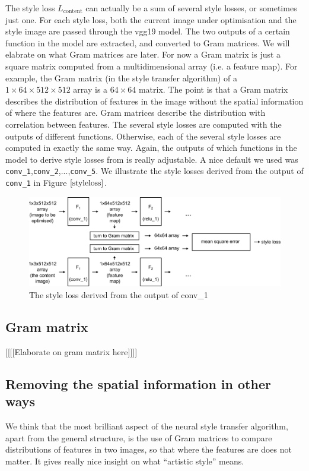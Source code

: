 \documentclass[runningheads]{llncs}
\begin{document}
The style loss $L_\text{content}$ can actually be a sum of several style losses, or sometimes just one.
For each style loss, 
both the current image under optimisation and the style image are passed through the vgg19 model.
The two outputs of a certain function in the model are extracted, 
and converted to Gram matrices. We will elabrate on what Gram matrices are later.
For now a Gram matrix is just a square matrix computed from a multidimensional array (i.e. a feature map).
For example, the Gram matrix (in the style transfer algorithm) of a $1\times64\times512\times512$ array
is a $64\times64$ matrix.
The point is that a Gram matrix describes the distribution of features
in the image without the spatial information of where the features are.
Gram matrices describe the distribution with correlation between features.
The several style losses are computed with the outputs of different functions.
Otherwise, each of the several style losses are computed in exactly the same way.
Again, the outputs of which functions in the model to derive style losses from is really adjustable.
A nice default we used was \verb|conv_1|,\verb|conv_2|,...,\verb|conv_5|. We illustrate
the style losses derived from the output of \verb|conv_1| in Figure $\ref{styleloss}$.

\begin{figure}
\center
\includegraphics[width=\textwidth]{styleloss.pdf}
\caption{The style loss derived from the output of conv\_1 \label{styleloss}}
\end{figure}

\subsection{Gram matrix}
[[[[Elaborate on gram matrix here]]]]

\subsection{Removing the spatial information in other ways}
We think that the most brilliant aspect of the neural style transfer algorithm,
apart from the general structure, is the use of Gram matrices to compare 
distributions of features in two images, so that where the features are does not matter.
It gives really nice insight on what ``artistic style'' means.
\end{document}
